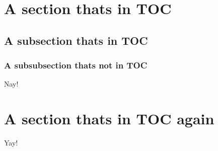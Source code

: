 \hypertarget{levels_first}{}\section{A section that\textquotesingle{}s in T\+OC}\label{levels_first}
\hypertarget{levels_first2}{}\subsection{A subsection that\textquotesingle{}s in T\+OC}\label{levels_first2}
\hypertarget{levels_first3}{}\subsubsection{A subsubsection that\textquotesingle{}s not in T\+OC}\label{levels_first3}
Nay!\hypertarget{levels_second}{}\section{A section that\textquotesingle{}s in T\+O\+C again}\label{levels_second}
Yay! 